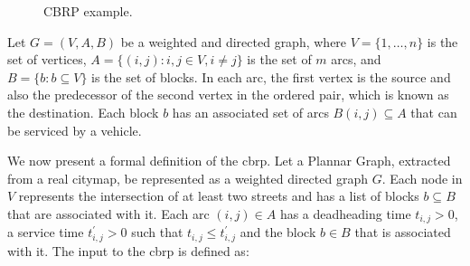 \begin{figure}[h!]
	\begin{minipage}[c]{.49\textwidth}
		\centering
		 \end{minipage}%
	\begin{minipage}[c]{.49\textwidth}
		\centering
	\end{minipage}
	\caption{\label{fig:route-ex} CBRP example.}
\end{figure}


Let $G = (V, A, B)$ be a weighted and directed graph, where $V = \{1, \dots, n\}$
is the set of vertices, $A = \{(i, j) : i, j \in V, i \neq j\}$
is the set of $m$ arcs, and $B = \{b : b \subseteq V\}$ is the set of blocks.
In each arc, the first vertex is the source and also the
predecessor of the second vertex in the ordered pair, which is known as the
destination. Each block $b$ has an associated set of arcs $B(i, j) \subseteq A$ that
can be serviced by a vehicle. 

We now present a formal definition of the \gls{cbrp}. Let a Plannar Graph,
extracted from a real citymap, be represented as a weighted directed graph
$G$. Each node in $V$ represents the intersection of at least two
streets and has a list of blocks $b \subseteq B$ that are associated with it.
Each arc $(i, j) \in A$ has a deadheading time $t_{i, j} > 0$, a service time
$t^{'}_{i, j} > 0$ such that $t_{i, j} \leqslant t^{'}_{i, j}$ and the block
$b \in B$ that is associated with it. The input to the \gls{cbrp} is defined as:

